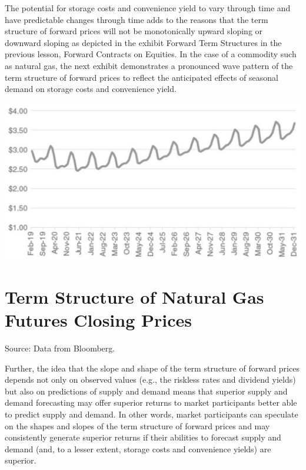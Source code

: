 \documentclass[11pt]{article}
\begin{document}
The potential for storage costs and convenience yield to vary through time and have predictable changes through time adds to the reasons that the term structure of forward prices will not be monotonically upward sloping or downward sloping as depicted in the exhibit Forward Term Structures in the previous lesson, Forward Contracts on Equities. In the case of a commodity such as natural gas, the next exhibit demonstrates a pronounced wave pattern of the term structure of forward prices to reflect the anticipated effects of seasonal demand on storage costs and convenience yield.

\begin{center}
\includegraphics[max width=\textwidth]{2024_04_10_524707c94c7a5febe5e0g-4}
\end{center}

\section*{Term Structure of Natural Gas Futures Closing Prices}
Source: Data from Bloomberg.

Further, the idea that the slope and shape of the term structure of forward prices depends not only on observed values (e.g., the riskless rates and dividend yields) but also on predictions of supply and demand means that superior supply and demand forecasting may offer superior returns to market participants better able to predict supply and demand. In other words, market participants can speculate on the shapes and slopes of the term structure of forward prices and may consistently generate superior returns if their abilities to forecast supply and demand (and, to a lesser extent, storage costs and convenience yields) are superior.
\end{document}
